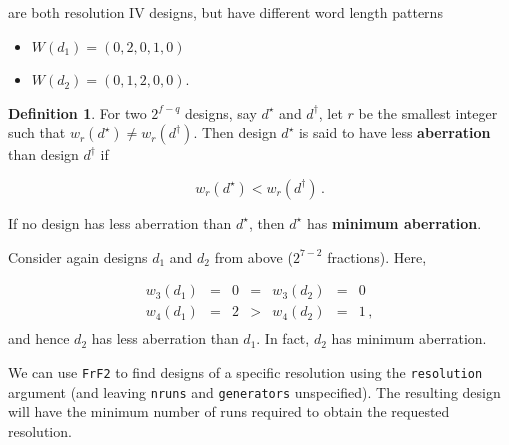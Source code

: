 \documentclass[
]{book}
\newenvironment{Shaded}{\begin{snugshade}}{\end{snugshade}}
\newcommand{\AttributeTok}[1]{\textcolor[rgb]{0.77,0.63,0.00}{#1}}
\newcommand{\DecValTok}[1]{\textcolor[rgb]{0.00,0.00,0.81}{#1}}
\newcommand{\FloatTok}[1]{\textcolor[rgb]{0.00,0.00,0.81}{#1}}
\newcommand{\FunctionTok}[1]{\textcolor[rgb]{0.00,0.00,0.00}{#1}}
\newcommand{\NormalTok}[1]{#1}
\newcommand{\OtherTok}[1]{\textcolor[rgb]{0.56,0.35,0.01}{#1}}
\newcommand{\SpecialCharTok}[1]{\textcolor[rgb]{0.00,0.00,0.00}{#1}}
\providecommand{\tightlist}{%
  \setlength{\itemsep}{0pt}\setlength{\parskip}{0pt}}
\theoremstyle{definition}
\newtheorem{definition}{Definition}[chapter]
\theoremstyle{definition}
\theoremstyle{definition}
\theoremstyle{definition}
\theoremstyle{remark}
\begin{document}
are both resolution IV designs, but have different word length patterns

\begin{itemize}
\tightlist
\item
  \(W(d_1) = (0, 2, 0, 1, 0)\)
\item
  \(W(d_2) = (0, 1, 2, 0, 0)\).
\end{itemize}

\begin{definition}
\protect\hypertarget{def:minab}{}\label{def:minab}For two \(2^{f-q}\) designs, say \(d^\star\) and \(d^\dagger\), let \(r\) be the smallest integer such that \(w_r(d^\star) \ne w_r(d^\dagger)\). Then design \(d^\star\) is said to have less \textbf{aberration} than design \(d^\dagger\) if

\[
w_r(d^\star) < w_r(d^\dagger)\,.
\]

If no design has less aberration than \(d^\star\), then \(d^\star\) has \textbf{minimum aberration}.
\end{definition}

Consider again designs \(d_1\) and \(d_2\) from above (\(2^{7-2}\) fractions). Here,

\[
\begin{array}{ccccccc}
w_3(d_1) & = & 0 & = & w_3(d_2) & = & 0 \\
w_4(d_1) & = & 2 & > & w_4(d_2) & = & 1 \,, \\
\end{array}
\]
and hence \(d_2\) has less aberration than \(d_1\). In fact, \(d_2\) has minimum aberration.

We can use \texttt{FrF2} to find designs of a specific resolution using the \texttt{resolution} argument (and leaving \texttt{nruns} and \texttt{generators} unspecified). The resulting design will have the minimum number of runs required to obtain the requested resolution.

\begin{Shaded}
\end{Shaded}
\end{document}
